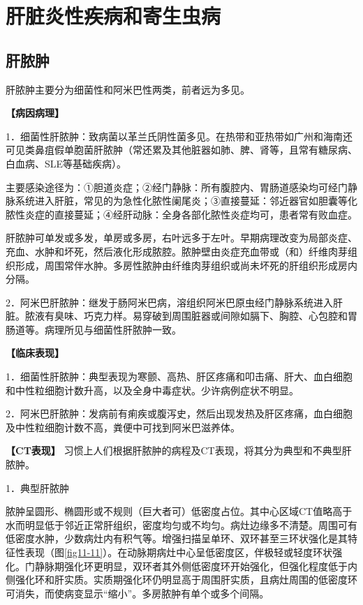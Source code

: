 \section{肝脏炎性疾病和寄生虫病}

\subsection{肝脓肿}

肝脓肿主要分为细菌性和阿米巴性两类，前者远为多见。

\textbf{【病因病理】}

1．细菌性肝脓肿：致病菌以革兰氏阴性菌多见。在热带和亚热带如广州和海南还可见类鼻疽假单胞菌肝脓肿（常还累及其他脏器如肺、脾、肾等，且常有糖尿病、白血病、SLE等基础疾病）。

主要感染途径为：①胆道炎症；②经门静脉：所有腹腔内、胃肠道感染均可经门静脉系统进入肝脏，常见的为急性化脓性阑尾炎；③直接蔓延：邻近器官如胆囊等化脓性炎症的直接蔓延；④经肝动脉：全身各部化脓性炎症均可，患者常有败血症。

肝脓肿可单发或多发，单房或多房，右叶远多于左叶。早期病理改变为局部炎症、充血、水肿和坏死，然后液化形成脓腔。脓肿壁由炎症充血带或（和）纤维肉芽组织形成，周围常伴水肿。多房性脓肿由纤维肉芽组织或尚未坏死的肝组织形成房内分隔。

2．阿米巴肝脓肿：继发于肠阿米巴病，溶组织阿米巴原虫经门静脉系统进入肝脏。脓液有臭味、巧克力样。易穿破到周围脏器或间隙如膈下、胸腔、心包腔和胃肠道等。病理所见与细菌性肝脓肿一致。

\textbf{【临床表现】}

1．细菌性肝脓肿：典型表现为寒颤、高热、肝区疼痛和叩击痛、肝大、血白细胞和中性粒细胞计数升高，以及全身中毒症状。少许病例症状不明显。

2．阿米巴肝脓肿：发病前有痢疾或腹泻史，然后出现发热及肝区疼痛，血白细胞及中性粒细胞计数不高，粪便中可找到阿米巴滋养体。

\textbf{【CT表现】}
习惯上人们根据肝脓肿的病程及CT表现，将其分为典型和不典型肝脓肿。

1．典型肝脓肿

脓肿呈圆形、椭圆形或不规则（巨大者可）低密度占位。其中心区域CT值略高于水而明显低于邻近正常肝组织，密度均匀或不均匀。病灶边缘多不清楚。周围可有低密度水肿，少数病灶内有积气等。增强扫描呈单环、双环甚至三环状强化是其特征性表现（图\ref{fig11-11}）。在动脉期病灶中心呈低密度区，伴极轻或轻度环状强化。门静脉期强化环更明显，双环者其外侧低密度环开始强化，但强化程度低于内侧强化环和肝实质。实质期强化环仍明显高于周围肝实质，且病灶周围的低密度环可消失，而使病变显示“缩小”。多房脓肿有单个或多个间隔。

